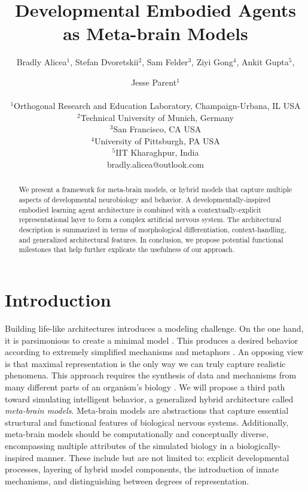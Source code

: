 \documentclass[letterpaper]{article}
\title{Developmental Embodied Agents as Meta-brain Models}
\author{Bradly Alicea$^{1}$, Stefan Dvoretskii$^{2}$, Sam Felder$^{3}$, Ziyi Gong$^{4}$, Ankit Gupta$^{5}$, \and Jesse Parent$^1$ \\
\mbox{}\\ 
$^1$Orthogonal Research and Education Laboratory, Champaign-Urbana, IL   USA \\
$^2$Technical University of Munich,  Germany \\
$^3$San Francisco, CA  USA \\
$^4$University of Pittsburgh,  PA   USA \\
$^5$IIT Kharaghpur, India \\
bradly.alicea@outlook.com}
\begin{document}
\maketitle

\begin{abstract}
We present a framework for meta-brain models, or hybrid models that capture multiple aspects of developmental neurobiology and behavior. A developmentally-inspired embodied learning agent architecture is combined with a contextually-explicit representational layer to form a complex artificial nervous system. The architectural description is summarized in terms of morphological differentiation, context-handling, and generalized architectural features. In conclusion, we propose potential functional milestones that help further explicate the usefulness of our approach. 
\end{abstract}

\section{Introduction}
Building life-like architectures introduces a modeling challenge. On the one hand, it is parsimonious to create a minimal model \citep{[1]}. This produces a desired behavior according to extremely simplified mechanisms and metaphors \citep{[2]}. An opposing view is that maximal representation \citep{[3]} is the only way we can truly capture realistic phenomena. This approach requires the synthesis of data and mechanisms from many different parts of an organism's biology \citep{[4]}. We will propose a third path toward simulating intelligent behavior, a generalized hybrid architecture called \textit{meta-brain models}. Meta-brain models are abstractions that capture essential structural and functional features of biological nervous systems. Additionally, meta-brain models should be computationally and conceptually diverse, encompassing multiple attributes of the simulated biology in a biologically-inspired manner. These include but are not limited to: explicit developmental processes, layering of hybrid model components, the introduction of innate mechanisms, and distinguishing between degrees of representation.
\end{document}
